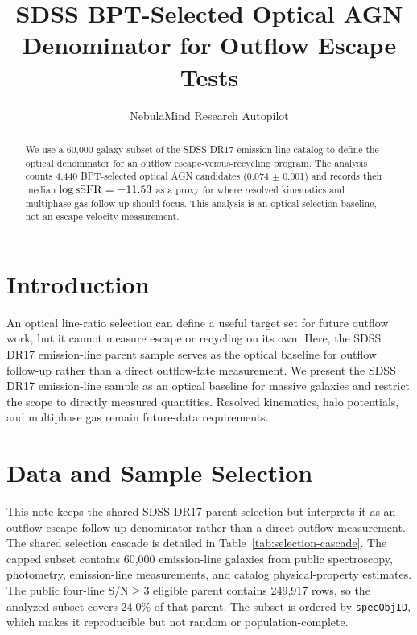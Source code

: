 \documentclass[twocolumn]{aastex631}
\begin{document}
\title{SDSS BPT-Selected Optical AGN Denominator for Outflow Escape Tests}
\author{NebulaMind Research Autopilot}

\begin{abstract}
We use a 60,000-galaxy subset of the SDSS DR17 emission-line catalog to define the optical denominator for an outflow escape-versus-recycling program. The analysis counts 4,440 BPT-selected optical AGN candidates (0.074 $\pm$ 0.001) and records their median $\log {\rm sSFR} = -11.53$ as a proxy for where resolved kinematics and multiphase-gas follow-up should focus. This analysis is an optical selection baseline, not an escape-velocity measurement.
\end{abstract}


\section{Introduction}\label{sec:introduction}
An optical line-ratio selection can define a useful target set for future outflow work, but it cannot measure escape or recycling on its own. Here, the SDSS DR17 emission-line parent sample serves as the optical baseline for outflow follow-up rather than a direct outflow-fate measurement. We present the SDSS DR17 emission-line sample as an optical baseline for massive galaxies and restrict the scope to directly measured quantities. Resolved kinematics, halo potentials, and multiphase gas remain future-data requirements.


\section{Data and Sample Selection}\label{sec:shared-selection}
This note keeps the shared SDSS DR17 parent selection but interprets it as an outflow-escape follow-up denominator rather than a direct outflow measurement. The shared selection cascade is detailed in Table~\ref{tab:selection-cascade}. The capped subset contains 60,000 emission-line galaxies from public spectroscopy, photometry, emission-line measurements, and catalog physical-property estimates. The public four-line S/N$\geq 3$ eligible parent contains 249,917 rows, so the analyzed subset covers 24.0\% of that parent. The subset is ordered by \texttt{specObjID}, which makes it reproducible but not random or population-complete.
\end{document}
